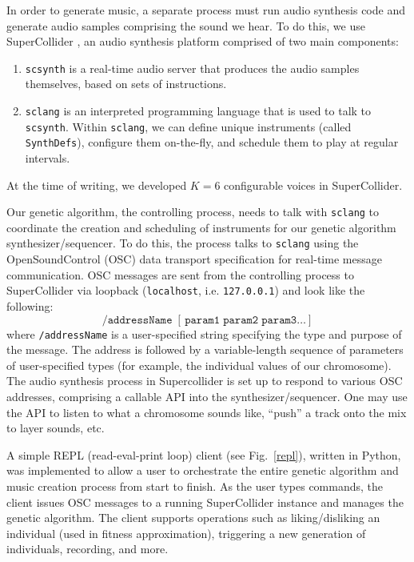 \documentclass[conference]{IEEEtran}
\begin{document}
In order to generate music, a separate process must run audio synthesis code
and generate audio samples comprising the sound we hear. To do this, we use
SuperCollider \cite{sc}, an audio synthesis platform comprised of
two main components:

\begin{enumerate}
    \item \texttt{scsynth} is a real-time audio server that produces the audio
          samples themselves, based on sets of instructions.
    \item \texttt{sclang} is an interpreted programming language that
          is used to talk to \texttt{scsynth}.  Within \texttt{sclang}, we
          can define unique
          instruments (called \texttt{SynthDefs}), configure them on-the-fly, and
          schedule them
          to play at regular intervals.
\end{enumerate}

At the time of writing, we developed $K=6$ configurable voices
in SuperCollider.

Our genetic algorithm, the controlling process, needs to talk with
\texttt{sclang} to coordinate the creation and scheduling of instruments
for our genetic algorithm synthesizer/sequencer. To do this, the process talks
to \texttt{sclang} using the OpenSoundControl (OSC) data transport
specification \cite{osc} for real-time message communication. OSC
messages are sent from the controlling process to SuperCollider via loopback
(\texttt{localhost}, i.e. \texttt{127.0.0.1}) and look like the
following:
%
\begin{equation}
    \texttt{/addressName}\;[\,\texttt{param1}\;\texttt{param2}\;\texttt{param3}\dots]
\end{equation}
%
where \texttt{/addressName} is a user-specified string specifying the type and
purpose of the message. The address is followed by a variable-length sequence
of parameters of user-specified types (for example, the individual values of
our chromosome). The audio synthesis process in Supercollider is set up to
respond to various OSC addresses, comprising a callable API into the
synthesizer/sequencer. One may use the API to listen to what a chromosome
sounds like, ``push'' a track onto the mix to layer sounds, etc.

A simple REPL (read-eval-print loop) client (see Fig.~\ref{repl}),
written in Python, was implemented to allow a user to orchestrate the entire
genetic algorithm and music creation process from start to finish. As the user
types commands, the client issues OSC messages to a running SuperCollider
instance and manages the genetic algorithm. The client supports operations such
as liking/disliking an individual (used in fitness approximation), triggering a
new generation of individuals, recording, and more.
\end{document}
